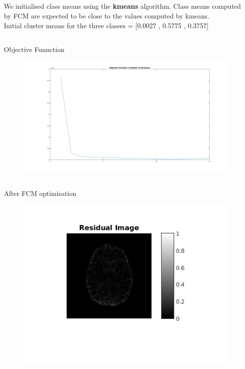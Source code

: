 \documentclass[11pt]{article}
\begin{document}
\FloatBarrier

\subsection{}
We initialised class means using the \textbf{kmeans} algorithm. Class means computed by FCM are expected to be close to the values computed by kmeans. \\
Initial cluster means for the three classes = [0.0027 ,   0.5775  ,  0.3757]

\subsection{}
Objective Funnction
\begin{figure}[h]
\includegraphics[scale=0.3]{objfun}
\end{figure}

\FloatBarrier

\subsection{}
After FCM optimisation

\begin{figure}[h]
\centering
\includegraphics[]{residual}
\end{figure}
\end{document}
